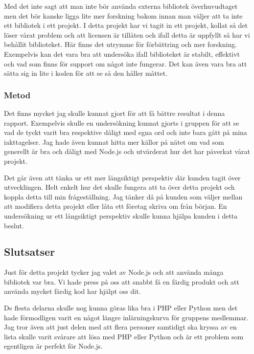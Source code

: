 Med det inte sagt att man inte bör använda externa bibliotek överhuvudtaget men det bör kanske ligga lite mer forskning bakom innan man väljer att ta inte ett bibliotek i ett projekt. I detta projekt har vi tagit in ett projekt, kollat så det löser vårat problem och att licensen är tillåten och ifall detta är uppfyllt så har vi behållit biblioteket. Här finns det utrymme för förbättring och mer forskning. Exempelvis kan det vara bra att undersöka ifall biblioteket är stabilt, effektivt och vad som finns för support om något inte fungerar. Det kan även vara bra att sätta sig in lite i koden för att se så den håller måttet.

\subsubsection{Metod}

Det finns mycket jag skulle kunnat gjort för att få bättre resultat i denna rapport. Exempelvis skulle en undersökning kunnat gjorts i gruppen för att se vad de tyckt varit bra respektive dåligt med egna ord och inte bara gått på mina iakttagelser. Jag hade även kunnat hitta mer källor på nätet om vad som generellt är bra och dåligt med Node.js och utvärderat hur det har påverkat vårat projekt. 

Det går även att tänka ur ett mer långsiktigt perspektiv där kunden tagit över utvecklingen. Helt enkelt hur det skulle fungera att ta över detta projekt och koppla detta till min frågeställning. Jag tänker då på kunden som väljer mellan att modifiera detta projekt eller låta ett företag skriva om från början. En undersökning ur ett långsiktigt perspektiv skulle kunna hjälpa kunden i detta beslut.

\subsection{Slutsatser}

Just för detta projekt tycker jag valet av Node.js och att använda många bibliotek var bra. Vi hade press på oss att snabbt få en färdig produkt och att använda mycket färdig kod har hjälpt oss dit. 

De flesta delarna skulle nog kunna göras lika bra i PHP eller Python men det hade förmodligen varit en något längre inlärningskurva för gruppens medlemmar. Jag tror även att just delen med att flera personer samtidigt ska kryssa av en lista skulle varit svårare att lösa med PHP eller Python och är ett problem som egentligen är perfekt för Node.js.


